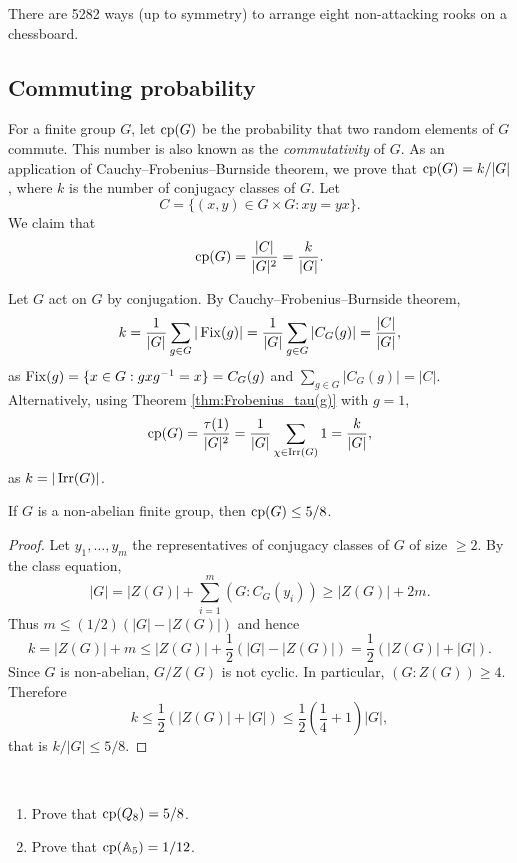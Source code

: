 There are 5282 ways (up to symmetry) to arrange 
eight non-attacking rooks on a chessboard. 

\subsection{Commuting probability}

For a finite group $G$, let $\operatorname{cp}(G)$ be the probability 
that two random elements of $G$ commute. This number
is also known as the \emph{commutativity} of $G$. 
As an application of Cauchy--Frobenius--Burnside theorem, we
prove that 
$\operatorname{cp}(G)=k/|G|$, where $k$ is the number of conjugacy classes
of $G$. Let 
\[
C=\{(x,y)\in G\times G:xy=yx\}.
\]
We claim that  
    \[
    \operatorname{cp}(G)=\frac{|C|}{|G|^2}=\frac{k}{|G|}.
    \]

Let $G$ act on $G$ by conjugation. 
    By Cauchy--Frobenius--Burnside theorem, 
    \[
    k=\frac{1}{|G|}\sum_{g\in G}|\operatorname{Fix}(g)|=\frac{1}{|G|}\sum_{g\in G}|C_G(g)|=\frac{|C|}{|G|},
    \]
    as $\operatorname{Fix}(g)=\{x\in G:gxg^{-1}=x\}=C_G(g)$ and $\sum_{g\in G}|C_G(g)|=|C|$. 
Alternatively, using Theorem \ref{thm:Frobenius_tau(g)} with $g = 1$,
\[
    \operatorname{cp}(G) = \frac{\tau(1)}{|G|^2} = \frac{1}{|G|}\sum_{\chi \in \operatorname{Irr}(G)} 1 = \frac{k}{|G|},
\]
as $k=|\operatorname{Irr}(G)|$. 
\begin{theorem}
\label{thm:5/8}
    If $G$ is a non-abelian finite group, then $\operatorname{cp}(G)\leq5/8$.
\end{theorem}

\begin{proof}
%
    Let $y_1,\dots,y_m$ the representatives of conjugacy classes of $G$ 
    of size $\geq2$. By the class equation, 
    \[
    |G|=|Z(G)|+\sum_{i=1}^m(G:C_G(y_i))\geq |Z(G)|+2m.
    \]
    Thus $m\leq(1/2)(|G|-|Z(G)|)$ and hence 
    \[
    k=|Z(G)|+m\leq |Z(G)|+\frac12(|G|-|Z(G)|)=\frac12(|Z(G)|+|G|).
    \]
    Since $G$ is non-abelian, $G/Z(G)$ is not cyclic. In particular, 
    $(G:Z(G))\geq4$. Therefore
    \[
    k\leq\frac12(|Z(G)|+|G|)\leq\frac12\left(\frac14+1\right)|G|,
    \]
    that is $k/|G|\leq 5/8$. 
\end{proof}

\begin{exercise}\
\begin{enumerate}
    \item Prove that $\operatorname{cp}(Q_8)=5/8$. 
    \item Prove that $\operatorname{cp}(\mathbb{A}_5)=1/12$. 
\end{enumerate}
\end{exercise}


